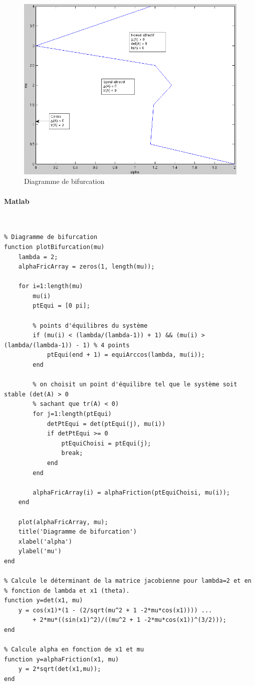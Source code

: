 \documentclass[11pt]{article}
\begin{document}
\begin{figure}[h!]
	\centering
	\includegraphics[scale=0.59]{Figures/rapport_bifur2.png}
	\caption{Diagramme de bifurcation}
\end{figure}

\newpage

\paragraph{Matlab}\mbox{}\\
\begin{lstlisting}
% Diagramme de bifurcation
function plotBifurcation(mu)
    lambda = 2;
    alphaFricArray = zeros(1, length(mu));

    for i=1:length(mu)
        mu(i)
        ptEqui = [0 pi];

        % points d'équilibres du système
        if (mu(i) < (lambda/(lambda-1)) + 1) && (mu(i) > (lambda/(lambda-1)) - 1) % 4 points
            ptEqui(end + 1) = equiArccos(lambda, mu(i));
        end

        % on choisit un point d'équilibre tel que le système soit stable (det(A) > 0
        % sachant que tr(A) < 0)
        for j=1:length(ptEqui)
            detPtEqui = det(ptEqui(j), mu(i))
            if detPtEqui >= 0
                ptEquiChoisi = ptEqui(j);
                break;
            end
        end

        alphaFricArray(i) = alphaFriction(ptEquiChoisi, mu(i));
    end

    plot(alphaFricArray, mu);
    title('Diagramme de bifurcation')
    xlabel('alpha')
    ylabel('mu')
end

% Calcule le déterminant de la matrice jacobienne pour lambda=2 et en
% fonction de lambda et x1 (theta).
function y=det(x1, mu)
    y = cos(x1)*(1 - (2/sqrt(mu^2 + 1 -2*mu*cos(x1)))) ...
        + 2*mu*((sin(x1)^2)/((mu^2 + 1 -2*mu*cos(x1))^(3/2)));
end

% Calcule alpha en fonction de x1 et mu
function y=alphaFriction(x1, mu)
    y = 2*sqrt(det(x1,mu));
end
\end{lstlisting}
\end{document}

